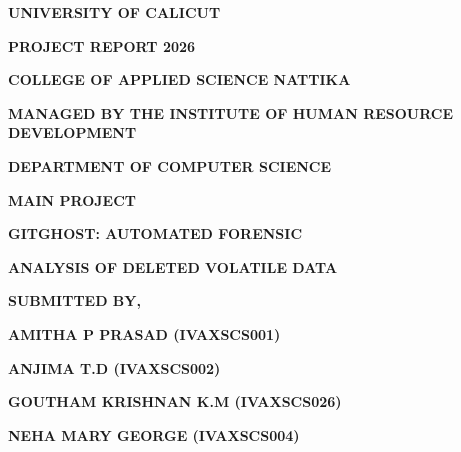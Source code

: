 \documentclass[12pt, a4paper, oneside]{report}
\begin{document}
\begin{center}
    \vspace*{0.2cm}
    {\large \textbf{UNIVERSITY OF CALICUT} \par}
    \vspace{0.6cm}
    {\large \textbf{PROJECT REPORT 2026} \par}
    \vspace{0.6cm}
    {\LARGE \textbf{COLLEGE OF APPLIED SCIENCE NATTIKA} \par}
    \vspace{0.4cm}
    {\small \textbf{MANAGED BY THE INSTITUTE OF HUMAN RESOURCE DEVELOPMENT} \par}
    
    \vspace{0.8cm}
    \begin{figure}[H]
        \centering
    \end{figure}
    
    \vspace{0.8cm}
    {\large \textbf{DEPARTMENT OF COMPUTER SCIENCE} \par}
    \vspace{0.6cm}
    {\large \textbf{MAIN PROJECT} \par}
    \vspace{0.4cm}
    {\Large \textbf{GITGHOST: AUTOMATED FORENSIC} \par}
    {\Large \textbf{ANALYSIS OF DELETED VOLATILE DATA} \par}
    
    \vspace{1.2cm}
    {\large \textbf{SUBMITTED BY,} \par}
    \vspace{0.4cm}
    {\textbf{AMITHA P PRASAD (IVAXSCS001)} \par}
    {\textbf{ANJIMA T.D (IVAXSCS002)} \par}
    {\textbf{GOUTHAM KRISHNAN K.M (IVAXSCS026)} \par}
    {\textbf{NEHA MARY GEORGE (IVAXSCS004)} \par}
\end{center}
\vfill
\newpage
\end{document}
